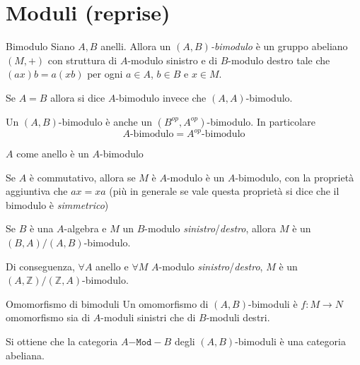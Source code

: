 \chapter{Moduli (reprise)}
\begin{definition}{Bimodulo}
    Siano \(A, B\) anelli. Allora un \({(A,B)}\)\emph{-bimodulo} è un gruppo abeliano
    \({(M, +)}\) con struttura di \(A\)-modulo sinistro e di \(B\)-modulo destro
    tale che \( {(ax)}b = a{(xb)}\) per ogni \(a \in A \), \(b \in B\) e \(x \in
    M\).

    Se \(A=B\) allora si dice \(A\)-bimodulo invece che \({(A,A)}\)-bimodulo.
\end{definition}
\begin{remark}{}
    Un \({(A,B)}\)-bimodulo è anche un \({(B^{op}, A^{op})}\)-bimodulo. In
    particolare
    \[
      A\text{-bimodulo} = A^{op}\text{-bimodulo}
    \]
\end{remark}
\begin{example}{}
    \(A\) come anello è un \(A\)-bimodulo
\end{example}
\begin{example}{}
    Se \(A\) è commutativo, allora se \(M\) è \(A\)-modulo è un \(A\)-bimodulo,
    con la proprietà aggiuntiva che \(ax = xa\) (più in generale se vale questa
    proprietà si dice che il bimodulo è \emph{simmetrico})
\end{example}
\begin{example}{}
    Se \(B\) è una \(A\)-algebra e \(M\) un \(B\)-modulo
    \emph{sinistro}/\emph{destro}, allora \(M\) è un
    \({(B,A)}/{(A,B)}\)-bimodulo.

    Di conseguenza, \(\forall A\) anello e \(\forall M\) \(A\)-modulo
    \emph{sinistro}/\emph{destro}, \(M\) è un
    \({(A,\mathbb{Z})}/{(\mathbb{Z},A)}\)-bimodulo.
\end{example}

\begin{definition}{Omomorfismo di bimoduli}
    Un omomorfismo di \({(A,B)}\)-bimoduli è \(f : M \to N\) omomorfismo sia di
    \(A\)-moduli sinistri che di \(B\)-moduli destri.
\end{definition}

Si ottiene che la categoria \(A\mathtt{-Mod-}B\) degli \({(A,B)}\)-bimoduli è
una categoria abeliana.



